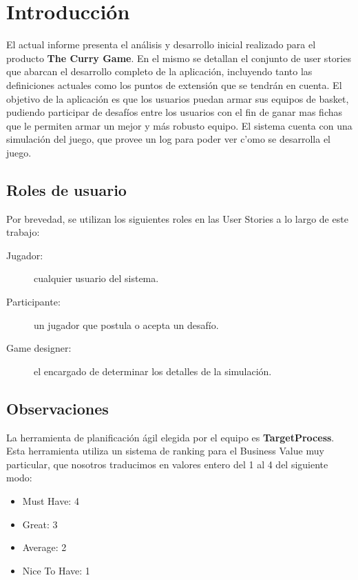 \documentclass[a4paper, 10pt, twoside]{article}
\begin{document}
\newpage

\tableofcontents

\newpage




\section{Introducción}

El actual informe presenta el an\'alisis y desarrollo inicial realizado para el producto \textbf{The Curry Game}. En el mismo se detallan el conjunto de user stories que abarcan el desarrollo completo de la aplicaci\'on, incluyendo tanto las definiciones actuales como los puntos de extensi\'on que se tendr\'an en cuenta. 
El objetivo de la aplicaci\'on es que los usuarios puedan armar sus equipos de basket, pudiendo participar de desaf\'ios entre los usuarios con el fin de ganar mas fichas que le permiten armar un mejor y m\'as robusto equipo. 
El sistema cuenta con una simulaci\'on del juego, que provee un log para poder ver c'omo se desarrolla el juego.


\subsection{Roles de usuario}

Por brevedad, se utilizan los siguientes roles en las User Stories a lo largo de este trabajo:

\begin{description}
  \item[Jugador:] cualquier usuario del sistema.

  \item[Participante:] un jugador que postula o acepta un desaf\'io.

  \item[Game designer:] el encargado de determinar los detalles de la simulaci\'on.


\end{description}

\subsection{Observaciones}
La herramienta de planificaci\'on \'agil elegida por el equipo es \textbf{TargetProcess}. Esta herramienta utiliza un sistema de ranking para el Business Value muy particular, que nosotros traducimos en valores entero del 1 al 4 del siguiente modo:
\begin{itemize}
    \item Must Have: 4
    \item Great: 3
    \item Average: 2
    \item Nice To Have: 1
\end{itemize} 
\end{document}
